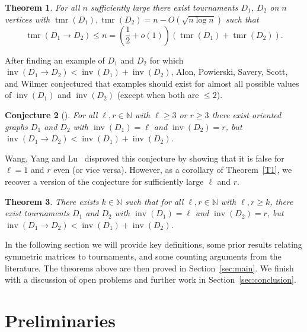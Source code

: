 \documentclass[10pt,a4paper]{amsart}
\numberwithin{equation}{section}
\theoremstyle{plain}
\newtheorem{thm}{Theorem}[section]
\newtheorem{conjecture}[thm]{Conjecture}
\theoremstyle{remark}
\theoremstyle{definition}
\newcommand{\lb}{\left(}
\newcommand{\rb}{\right)}
\newcommand{\tmr}{\operatorname{tmr}}
\newcommand{\inv}{\operatorname{inv}}
\begin{document}
\bigskip 
\begin{thm} \label{T2}
    For all $n$ sufficiently large there exist tournaments $D_1$, $D_2$ on $n$ vertices with $\tmr(D_1),\tmr(D_2) = n - O(\sqrt{n\log{n}})$ such that 
    \begin{equation*}
       \tmr(D_1 \to D_2) \le n = \lb\frac{1}{2} +o(1)\rb(\tmr(D_1)+\tmr(D_2)).
    \end{equation*}
\end{thm}

\bigskip

After finding an example of $D_1$ and $D_2$ for which $\inv(D_1\rightarrow D_2) < \inv(D_1) + \inv(D_2)$, Alon, Powierski, Savery, Scott, and Wilmer \cite{Alon} conjectured that examples should exist for almost all possible values of $\inv(D_1)$ and $\inv(D_2)$ (except when both are $\le 2$).
\begin{conjecture}[]
    For all $\ell ,r\in \mathbb{N}$ with $\ell \geq 3$ or $r\geq 3$ there exist oriented graphs $D_1$ and $D_2$ with $\inv(D_1) =\ell$ and $\inv(D_2) =r$, but $\inv(D_1\rightarrow D_2)< \inv(D_1) + \inv(D_2)$.
\end{conjecture}
Wang, Yang and Lu~\cite{Wang} disproved this conjecture by showing that it is false for $\ell=1$ and $r$ even (or vice versa). However, as a corollary of Theorem~\ref{T1}, we recover a version of the conjecture for sufficiently large $\ell$ and $r$.
\begin{thm}\label{thm:all_ell_r}
    There exists $k \in \mathbb{N}$ such that for all $\ell ,r\in \mathbb{N}$ with $\ell,r \geq k$, there exist tournaments $D_1$ and $D_2$ with $\inv(D_1) =\ell$ and $\inv(D_2) =r$, but $\inv(D_1\rightarrow D_2)< \inv(D_1) + \inv(D_2)$. 
\end{thm}


In the following section we will provide key definitions, some prior results relating symmetric matrices to tournaments, and some counting arguments from the literature. The theorems above are then proved in Section~\ref{sec:main}. We finish with a discussion of open problems and further work in Section~\ref{sec:conclusion}.



\section{Preliminaries}
\end{document}
